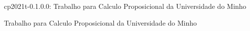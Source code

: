 \documentclass{book}
\begin{document}
\begin{titlepage}
\begin{haddocktitle}
cp2021t-0.1.0.0: Trabalho para Calculo Proposicional da Universidade do Minho
\end{haddocktitle}
\begin{haddockprologue}
Trabalho para Calculo Proposicional da Universidade do Minho\par
\end{haddockprologue}
\end{titlepage}
\tableofcontents






\end{document}
